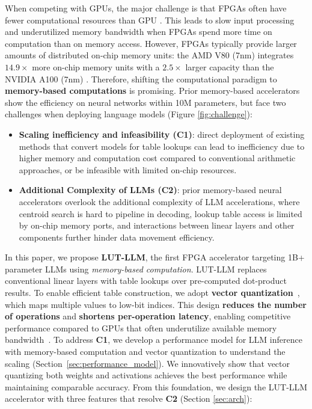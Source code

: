 \documentclass[conference]{IEEEtran}
\begin{document}
When competing with GPUs, the major challenge is that FPGAs often have fewer computational resources than GPU \cite{amd2023alveou280, nvidia2020v100, amd2024alveov80, nvidia2021a100}. This leads to slow input processing and underutilized memory bandwidth when FPGAs spend more time on computation than on memory access. However, FPGAs typically provide larger amounts of distributed on-chip memory units: the AMD V80 (7nm) \cite{amd2024alveov80} integrates $14.9\times$ more on-chip memory units with a $2.5\times$ larger capacity than the NVIDIA A100 (7nm) \cite{nvidia2021a100}. Therefore, shifting the computational paradigm to \textbf{memory-based computations} is promising. Prior memory-based accelerators \cite{li2025lut, gerlinghoff2024table, andronic2025neuralut, miyasaka2024synthesis} show the efficiency on neural networks within 10M parameters, but face two challenges when deploying language models (Figure \ref{fig:challenge}):

\begin{itemize}[wide=0pt]
    \item \textbf{Scaling inefficiency and infeasibility (C1)}: direct deployment of existing methods that convert models for table lookups \cite{li2025lut, liu2024vptq, van2024gptvq} can lead to inefficiency due to higher memory and computation cost compared to conventional arithmetic approaches, or be infeasible with limited on-chip resources.
    \item \textbf{Additional Complexity of LLMs (C2)}: prior memory-based neural accelerators overlook the additional complexity of LLM accelerations, where centroid search is hard to pipeline in decoding, lookup table access is limited by on-chip memory ports, and interactions between linear layers and other components further hinder data movement efficiency.

\end{itemize}

In this paper, we propose \textbf{LUT-LLM}, the first FPGA accelerator targeting 1B+ parameter LLMs using \textit{memory-based computation}. LUT-LLM replaces conventional linear layers with table lookups over pre-computed dot-product results. To enable efficient table construction, we adopt \textbf{vector quantization}~\cite{gray1984vector}, which maps multiple values to low-bit indices. This design \textbf{reduces the number of operations} and \textbf{shortens per-operation latency}, enabling competitive performance compared to GPUs that often underutilize available memory bandwidth~\cite{zeng2024flightllm}. To address \textbf{C1}, we develop a performance model for LLM inference with memory-based computation and vector quantization to understand the scaling (Section~\ref{sec:performance_model}). We innovatively show that vector quantizing both weights and activations achieves the best performance while maintaining comparable accuracy. From this foundation, we design the LUT-LLM accelerator with three features that resolve \textbf{C2} (Section \ref{sec:arch}):
\end{document}
